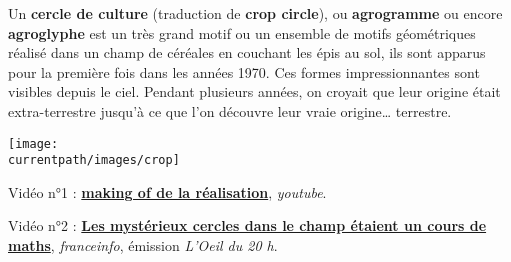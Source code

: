 

\vfill

\begin{debat}
    Un {\bf cercle de culture} (traduction de {\bf crop circle}), ou {\bf agrogramme} ou encore {\bf agroglyphe} est un très grand motif ou un ensemble de motifs géométriques réalisé dans un champ de céréales en couchant les épis au sol, ils sont apparus pour la première fois dans les années 1970. Ces formes impressionnantes sont visibles depuis le ciel. Pendant plusieurs années, on croyait que leur origine était extra-terrestre jusqu'à ce que l'on découvre leur vraie origine\dots{} terrestre.
    \begin{center} 
       \texttt{[image: \\currentpath/images/crop]}
    \end{center}
    \bigskip
    \begin{cadre}[B2][F4]
       \begin{center}        
        Vidéo n°1 : \href{https://www.youtube-nocookie.com/embed/AqjSJuhdZ_s?playlist=AqjSJuhdZ_s&autoplay=1&iv_load_policy=3&loop=1&modestbranding=1&start=}{\bf making of de la réalisation}, {\it youtube}.

        Vidéo n°2 : \href{https://www.francetvinfo.fr/replay-jt/france-2/20-heures/video-en-alsace-les-mysterieux-cercles-dans-le-champ-etaient-un-cours-de-maths_3505711.html}{\bf Les mystérieux cercles dans le champ étaient un cours de maths}, {\it franceinfo}, émission {\it L'Oeil du 20 h}.
       \end{center}
    \end{cadre}
 \end{debat}